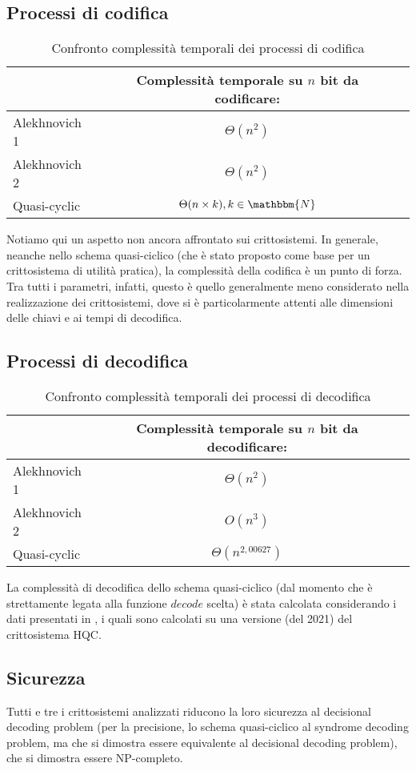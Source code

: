 \documentclass[12pt, a4paper]{report}
\theoremstyle{definition}
\begin{document}
			\subsection{Processi di codifica}
				\begin{table}[H]
					\centering
					\begin{tabular}[t]{lcc}
						\hline
						&Complessità temporale su $n$ bit da codificare:\\
						\hline
						Alekhnovich 1&$\Theta(n^2)$\\
						Alekhnovich 2&$\Theta(n^2)$\\
						Quasi-cyclic&$\Theta(n\times k), k\in\mathbbm{N}$\\
						\hline
					\end{tabular}
					\caption{Confronto complessità temporali dei processi di codifica}				
				\end{table}
				Notiamo qui un aspetto non ancora affrontato sui crittosistemi. In generale, neanche nello schema quasi-ciclico (che è stato proposto come base per un crittosistema di utilità pratica), la complessità della codifica è un punto di forza. Tra tutti i parametri, infatti, questo è quello generalmente meno considerato nella realizzazione dei crittosistemi, dove si è particolarmente attenti alle dimensioni delle chiavi e ai tempi di decodifica.
			\subsection{Processi di decodifica}
				\begin{table}[H]
					\centering
					\begin{tabular}[t]{lcc}
						\hline
						&Complessità temporale su $n$ bit da decodificare:\\
						\hline
						Alekhnovich 1&$\Theta(n^2)$\\
						Alekhnovich 2&$O(n^3)$\\
						Quasi-cyclic&$\Theta(n^{2,00627})$\\
						\hline
					\end{tabular}
					\caption{Confronto complessità temporali dei processi di decodifica}
				\end{table}
				La complessità di decodifica dello schema quasi-ciclico (dal momento che è strettamente legata alla funzione $decode$ scelta) è stata calcolata considerando i dati presentati in \cite{16}, i quali sono calcolati su una versione (del 2021) del crittosistema HQC.
			\subsection{Sicurezza \cite{9}}
				Tutti e tre i crittosistemi analizzati riducono la loro sicurezza al decisional decoding problem (per la precisione, lo schema quasi-ciclico al syndrome decoding problem, ma che si dimostra essere equivalente al decisional decoding problem), che si dimostra essere NP-completo.
\end{document}
